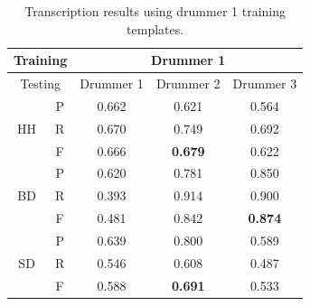 \documentclass{article}
\begin{document}
\begin{table}[h]
\begin{center}
\begin{tabular}{|c|c|c|c|c|}
\hline
\multicolumn{2}{|c}{Training} & \multicolumn{3}{|c|}{Drummer 1}   \\ \hline
\multicolumn{2}{|c|}{Testing} & Drummer 1 & Drummer 2 & Drummer 3 \\ \hline
\multirow{3}{*}{HH}    & P    & 0.662     & 0.621     & 0.564     \\ \cline{2-5} 
                       & R    & 0.670     & 0.749     & 0.692     \\ \cline{2-5} 
                       & F    & 0.666     & \textbf{0.679}     & 0.622     \\ \hline
\multirow{3}{*}{BD}    & P    & 0.620     & 0.781     & 0.850      \\ \cline{2-5} 
                       & R    & 0.393     & 0.914     & 0.900      \\ \cline{2-5} 
                       & F    & 0.481     & 0.842     & \textbf{0.874}     \\ \hline
\multirow{3}{*}{SD}    & P    & 0.639     & 0.800     & 0.589     \\ \cline{2-5} 
                       & R    & 0.546     & 0.608     & 0.487     \\ \cline{2-5} 
                       & F    & 0.588     & \textbf{0.691}     & 0.533     \\ \hline
\end{tabular}
 \caption{Transcription results using drummer 1 training templates.}
 \label{tab:trainDr1}
\end{center}
\end{table}
\end{document}
